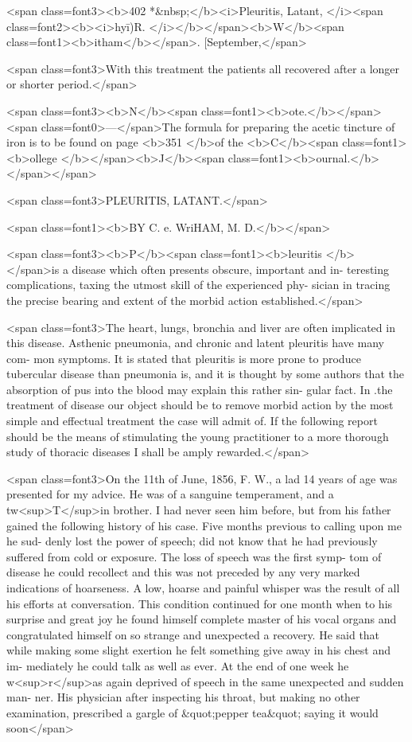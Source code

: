 <span class=font3><b>402     *&nbsp;</b><i>Pleuritis, Latant, </i><span class=font2><b><i>hyī)R. </i></b></span><b>W</b><span class=font1><b>itham</b></span>. [September,</span>

<span class=font3>With this treatment the patients all recovered after a longer or shorter
period.</span>

<span class=font3><b>N</b><span class=font1><b>ote.</b></span><span class=font0>—</span>The formula for preparing the acetic tincture of iron is to be
found on page <b>351 </b>of the <b>C</b><span class=font1><b>ollege </b></span><b>J</b><span class=font1><b>ournal.</b></span></span>

<span class=font3>PLEURITIS, LATANT.</span>

<span class=font1><b>BY C. e. WriHAM, M. D.</b></span>

<span class=font3><b>P</b><span class=font1><b>leuritis </b></span>is a disease which often presents obscure, important and in-
teresting complications, taxing the utmost skill of the experienced phy-
sician in tracing the precise bearing and extent of the morbid action
established.</span>

<span class=font3>The heart, lungs, bronchia and liver are often implicated in this disease.
Asthenic pneumonia, and chronic and latent pleuritis have many com-
mon symptoms. It is stated that pleuritis is more prone to produce
tubercular disease than pneumonia is, and it is thought by some authors
that the absorption of pus into the blood may explain this rather sin-
gular fact. In .the treatment of disease our object should be to remove
morbid action by the most simple and effectual treatment the case will
admit of. If the following report should be the means of stimulating
the young practitioner to a more thorough study of thoracic diseases I
shall be amply rewarded.</span>

<span class=font3>On the 11th of June, 1856, F. W., a lad 14 years of age was presented
for my advice. He was of a sanguine temperament, and a tw<sup>T</sup>in brother.
I had never seen him before, but from his father gained the following
history of his case. Five months previous to calling upon me he sud-
denly lost the power of speech; did not know that he had previously
suffered from cold or exposure. The loss of speech was the first symp-
tom of disease he could recollect and this was not preceded by any
very marked indications of hoarseness. A low, hoarse and painful
whisper was the result of all his efforts at conversation. This condition
continued for one month when to his surprise and great joy he found
himself complete master of his vocal organs and congratulated himself
on so strange and unexpected a recovery. He said that while making
some slight exertion he felt something give away in his chest and im-
mediately he could talk as well as ever. At the end of one week he
w<sup>r</sup>as again deprived of speech in the same unexpected and sudden man-
ner. His physician after inspecting his throat, but making no other
examination, prescribed a gargle of &quot;pepper tea&quot; saying it would soon</span>
